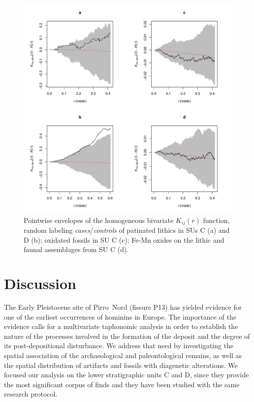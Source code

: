 \documentclass[review,authoryear]{elsarticle} %
\begin{document}
\begin{figure}
  \centering
  \includegraphics[width=1\textwidth]{../artwork/Fig9.pdf}
  \caption{Pointwise envelopes of the homogeneous bivariate $K_{ij}(r)$ function, random labeling \emph{cases}/\emph{controls} of patinated lithics in SUs C (a) and D (b); oxidated fossils in SU C (c); Fe-Mn oxides on the lithic and faunal assemblages from SU C (d).}
  \label{fig:9}
\end{figure}

\section{Discussion}

The Early Pleistocene site of Pirro~Nord (fissure P13) has yielded evidence for one of the earliest occurrences of hominins in Europe. The importance of the evidence calls for a multivariate taphonomic analysis in order to establish the nature of the processes involved in the formation of the deposit and the degree of its post-depositional disturbance. We address that need by investigating the spatial association of the archaeological and paleontological remains, as well as the spatial distribution of artifacts and fossils with diagenetic alterations. We focused our analysis on the lower stratigraphic units C and D, since they provide the most significant corpus of finds and they have been studied with the same research protocol.
\end{document}
